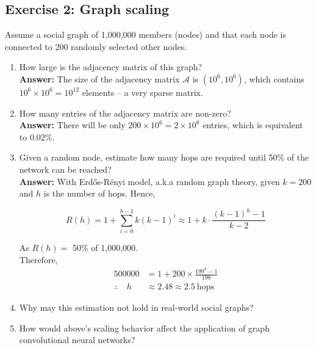 \documentclass[11pt]{article}
\begin{document}
\subsection*{Exercise 2: Graph scaling}

\noindent
Assume a social graph of 1,000,000 members (nodes) and that each node is connected to 200
randomly selected other nodes.

\begin{enumerate}[label=(\alph*)]
    \item {
        How large is the adjacency matrix of this graph? \\ 
        \textbf{Answer: } The size of the adjacency matrix \(\mathcal{A}\) is \((10^6, 10^6)\), which contains \(10^6 \times 10^6 = 10^12\) elements -- a very sparse matrix.  
    }
    \item {
        How many entries of the adjacency matrix are non-zero? \\
        \textbf{Answer: } There will be only \(200 \times 10^6 = 2 \times 10^8\) entries, which is equivalent to 0.02\%.
    }
    \item {
        Given a random node, estimate how many hops are required until 50\% of the network can be reached? \\ 
        \textbf{Answer: } With Erdős-Rényi model, a.k.a random graph theory, given \(k = 200\) and \(h\) is the number of hops.
        Hence,
        
        \[
            R(h) = 1 + \sum_{i=0}^{h-1} k(k-1)^i \approx 1 + k \cdot \frac{(k-1)^h - 1}{k-2}
        \]

        As \(R(h) =\) 50\% of 1,000,000. \\ 
        Therefore, 
            \begin{align*}
                500000 &= 1 + 200 \times \frac{199^h - 1}{198} \\
                \therefore \quad h &\approx 2.48 \approx 2.5 \ \text{hops} 
            \end{align*}
    }
    \item Why may this estimation not hold in real-world social graphs?
    \item How would above’s scaling behavior affect the application of graph convolutional neural
networks?
\end{enumerate} 
\end{document}
